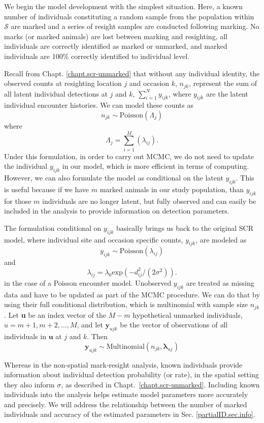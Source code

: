 We begin the model development with the simplest situation. Here, a
known number of individuals constituting a random
sample from the population within $\mathcal{S}$ are marked and a
series of resight samples are conducted following marking. No marks
(or marked animals) are lost between marking and resighting, all
individuals are correctly identified as marked or unmarked, and marked
individuals are 100\% correctly identified to individual level.

Recall from Chapt. \ref{chapt.scr-unmarked} that without any
individual identity, the observed counts at resighting location $j$
and occasion $k$, $n_{jk}$, represent the sum of all latent individual
detections at $j$ and $k$, $\displaystyle\sum\limits_{i=1}^{N}
y_{ijk}$, where $y_{ijk}$ are the latent individual encounter
histories.  We can model these counts as
\[
n_{jk} \sim \mbox{Poisson}( \Lambda_{j} )
\]
where
\[
\Lambda_{j} = \sum_{i=1}^{M}( \lambda_{ij} ).
\]
Under this formulation, in order to carry out MCMC, we do not need to
update the individual $y_{ijk}$ in our model, which is more efficient
in terms of computing. However, we can also formulate the model as
conditional on the latent $y_{ijk}$. This is useful because if we have
$m$ marked animals in our study population, than $y_{ijk}$ for those
$m$ individuals are no longer latent, but fully observed and can
easily be included in the analysis to provide information on detection
parameters.

The formulation conditional on $y_{ijk}$ basically brings us back to
the original SCR model, where individual site and occasion specific
counts, $y_{ijk}$, are modeled as
\[
y_{ijk} \sim \mbox{Poisson}(\lambda_{ij})
\]
and
\[
\lambda_{ij} = \lambda_0  \mbox{exp}(-d_{ij}^2/(2 \sigma^2)).
\]
in the case of a Poisson encounter model.
Unobserved $y_{ijk}$ are treated as missing data and have to be
updated as part of the MCMC procedure. We can do that by using their
full conditional distribution, which is multinomial with sample size
$n_{jk}$.
Let \textbf{u} be an index vector of the $M-m$ hypothetical
unmarked individuals, $u=m+1, m+2, \ldots, M$, and let $\mathbf{y}_{ujk}$ be the vector of observations of {\emph all} individuals in $\mathbf{u}$ at $j$ and $k$. Then
\[
\mathbf{y}_{ujk} \sim \mbox{Multinomial} (n_{jk}, \mathbf{\lambda}_{uj})
\]

Whereas in the non-spatial mark-resight analysis, known individuals
provide information about individual detection probability (or rate),
in the spatial setting they also inform $\sigma$, as described in
Chapt.~\ref{chapt.scr-unmarked}. Including known individuals into the
analysis helps estimate model parameters more accurately and
precisely. We will address the relationship between the number of
marked individuals and accuracy of the estimated parameters in
Sec. \ref{partialID.sec.info}.


